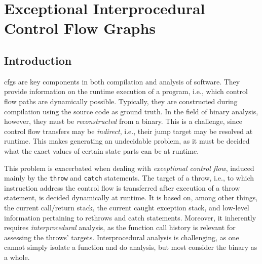 \chapter{Exceptional Interprocedural Control Flow Graphs}\label{ch:eicfg}


\section{Introduction}

\Acp{cfg} are key components in both compilation and analysis of software. 
They provide information on the runtime execution of a program, i.e., which control flow paths are dynamically possible.
Typically, they are constructed during compilation using the source code as ground truth.
In the field of binary analysis, however, they must be \emph{reconstructed} from a binary. 
This is a challenge, since control flow transfers may be \emph{indirect}, i.e., their jump target may be resolved at runtime.
This makes generating  an undecidable problem, as it must be decided what the exact values of certain state parts can be at runtime.


This problem is exacerbated when dealing with \emph{exceptional control flow}, induced mainly by the \Cpp{} \lstinline{throw} and \lstinline{catch} statements.
The target of a throw, i.e., to which instruction address the control flow is transferred after execution of a throw statement, is decided dynamically at runtime.
It is based on, among other things, the current call/return stack, the current caught exception stack, and low-level information pertaining to rethrows and catch statements.
Moreover, it inherently requires \emph{interprocedural} analysis, as the function call history is relevant for assessing the throws’ targets.
Interprocedural analysis is challenging, as one cannot simply isolate a function and do analysis, but most consider the binary as a whole.


